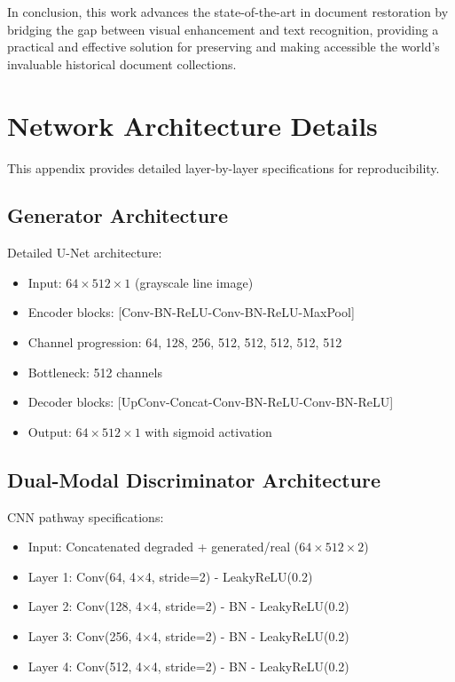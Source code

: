 \documentclass[journal]{IEEEtran}
\begin{document}
In conclusion, this work advances the state-of-the-art in document restoration by bridging the gap between visual enhancement and text recognition, providing a practical and effective solution for preserving and making accessible the world's invaluable historical document collections.

\appendices

\section{Network Architecture Details}


This appendix provides detailed layer-by-layer specifications for reproducibility.

\subsection{Generator Architecture}

Detailed U-Net architecture:
\begin{itemize}
    \item Input: $64 \times 512 \times 1$ (grayscale line image)
    \item Encoder blocks: [Conv-BN-ReLU-Conv-BN-ReLU-MaxPool]
    \item Channel progression: 64, 128, 256, 512, 512, 512, 512, 512
    \item Bottleneck: 512 channels
    \item Decoder blocks: [UpConv-Concat-Conv-BN-ReLU-Conv-BN-ReLU]
    \item Output: $64 \times 512 \times 1$ with sigmoid activation
\end{itemize}

\subsection{Dual-Modal Discriminator Architecture}

CNN pathway specifications:
\begin{itemize}
    \item Input: Concatenated degraded + generated/real ($64 \times 512 \times 2$)
    \item Layer 1: Conv(64, 4×4, stride=2) - LeakyReLU(0.2)
    \item Layer 2: Conv(128, 4×4, stride=2) - BN - LeakyReLU(0.2)
    \item Layer 3: Conv(256, 4×4, stride=2) - BN - LeakyReLU(0.2)
    \item Layer 4: Conv(512, 4×4, stride=2) - BN - LeakyReLU(0.2)
\end{itemize}
\end{document}
